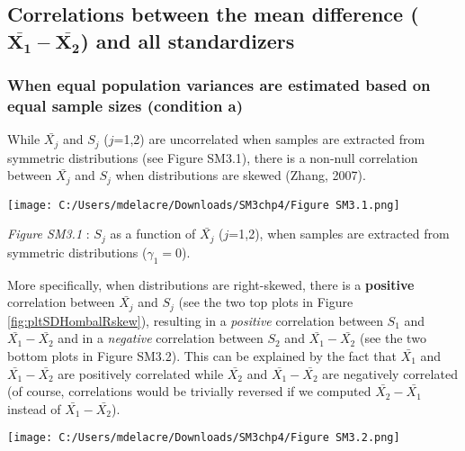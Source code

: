 \documentclass[
  english,
  man,mask,floatsintext]{apa6}
\begin{document}
\hypertarget{correlations-between-the-mean-difference-bmbarx_1-barx_2-and-all-standardizers}{%
\subsection{\texorpdfstring{Correlations between the mean difference (\(\bm{\bar{X_1}-\bar{X_2}}\)) and all standardizers}{Correlations between the mean difference (\textbackslash bm\{\textbackslash bar\{X\_1\}-\textbackslash bar\{X\_2\}\}) and all standardizers}}\label{correlations-between-the-mean-difference-bmbarx_1-barx_2-and-all-standardizers}}

\hypertarget{when-equal-population-variances-are-estimated-based-on-equal-sample-sizes-condition-a}{%
\subsubsection{When equal population variances are estimated based on equal sample sizes (condition a)}\label{when-equal-population-variances-are-estimated-based-on-equal-sample-sizes-condition-a}}

While \(\bar{X_j}\) and \(S_j\) (\(j\)=1,2) are uncorrelated when samples are extracted from symmetric distributions (see Figure SM3.1), there is a non-null correlation between \(\bar{X_j}\) and \(S_j\) when distributions are skewed (Zhang, 2007).

\texttt{[image: C:/Users/mdelacre/Downloads/SM3chp4/Figure SM3.1.png]}

\setlength\parindent{0pt}\emph{Figure SM3.1} : \(S_j\) as a function of \(\bar{X_j}\) (\(j\)=1,2), when samples are extracted from symmetric distributions (\(\gamma_1 = 0\)).

\setlength\parindent{24pt}More specifically, when distributions are right-skewed, there is a \textbf{positive} correlation between \(\bar{X_j}\) and \(S_j\) (see the two top plots in Figure \ref{fig:pltSDHombalRskew}), resulting in a \emph{positive} correlation between \(S_1\) and \(\bar{X_1}-\bar{X_2}\) and in a \emph{negative} correlation between \(S_2\) and \(\bar{X_1}-\bar{X_2}\) (see the two bottom plots in Figure SM3.2). This can be explained by the fact that \(\bar{X_1}\) and \(\bar{X_1}-\bar{X_2}\) are positively correlated while \(\bar{X_2}\) and \(\bar{X_1}-\bar{X_2}\) are negatively correlated (of course, correlations would be trivially reversed if we computed \(\bar{X_2}-\bar{X_1}\) instead of \(\bar{X_1}-\bar{X_2}\)).

\texttt{[image: C:/Users/mdelacre/Downloads/SM3chp4/Figure SM3.2.png]}
\end{document}

